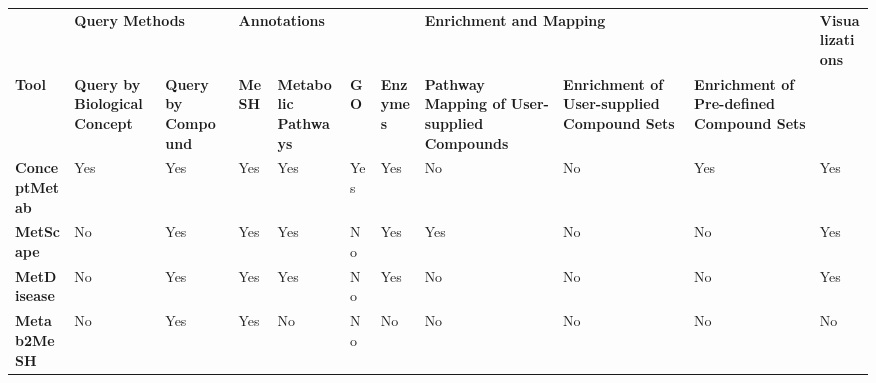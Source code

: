 \newpage

\begin{sidewaystable}[!ht]
\tiny
\centering
\begin{tabular}{l|p{1.5cm}p{1.5cm}|p{1cm}p{1cm}p{1cm}p{1cm}|p{2cm}p{2cm}p{2cm}|p{2cm}}
\textbf{}             & \multicolumn{2}{l}{\textbf{Query Methods}}                        & \multicolumn{4}{l}{\textbf{Annotations}}                                     & \multicolumn{3}{l}{\textbf{Enrichment and Mapping}}                                                                                                         & \textbf{Visualizations} \\
\textbf{Tool}         & \textbf{Query by Biological Concept} & \textbf{Query by Compound} & \textbf{MeSH} & \textbf{Metabolic Pathways} & \textbf{GO} & \textbf{Enzymes} & \textbf{Pathway Mapping of User-supplied Compounds} & \textbf{Enrichment of User-supplied Compound Sets} & \textbf{Enrichment of Pre-defined Compound Sets} & \textbf{}               \\\hline
\textbf{ConceptMetab} & Yes                                  & Yes                        & Yes           & Yes                         & Yes         & Yes              & No                                                  & No                                                 & Yes                                              & Yes                     \\
\textbf{MetScape}     & No                                   & Yes                        & Yes           & Yes                         & No          & Yes              & Yes                                                 & No                                                 & No                                               & Yes                     \\
\textbf{MetDisease}   & No                                   & Yes                        & Yes           & Yes                         & No          & Yes              & No                                                  & No                                                 & No                                               & Yes                     \\
\textbf{Metab2MeSH}   & No                                   & Yes                        & Yes           & No                          & No          & No               & No                                                  & No                                                 & No                                               & No                      \\

\end{tabular}
\end{sidewaystable}
